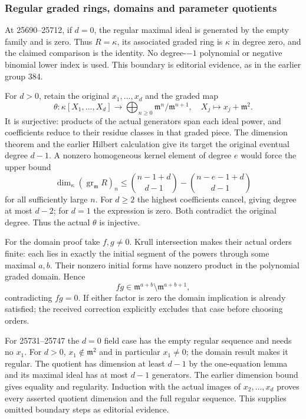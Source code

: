 \subsubsection{Regular graded rings, domains and parameter quotients}\label{algebra-proof-020-regular-graded-rings-domains-and-parameter-quotients}

At 25690--25712, if \(d=0\), the regular maximal ideal is generated by the empty family and is zero. Thus \(R=\kappa\), its associated graded ring is \(\kappa\) in degree zero, and the claimed comparison is the identity. No degree-\(-1\) polynomial or negative binomial lower index is used. This boundary is editorial evidence, as in the earlier group 384.

For \(d>0\), retain the original \(x_1,\ldots,x_d\) and the graded map \[
 \theta:\kappa[X_1,\ldots,X_d]\longrightarrow
 \bigoplus_{n\ge0}\mathfrak m^n/\mathfrak m^{n+1},\quad
 X_j\longmapsto x_j+\mathfrak m^2.
\] It is surjective: products of the actual generators span each ideal power, and coefficients reduce to their residue classes in that graded piece. The dimension theorem and the earlier Hilbert calculation give its target the original eventual degree \(d-1\). A nonzero homogeneous kernel element of degree \(e\) would force the upper bound \[
 \dim_\kappa(\operatorname{gr}_{\mathfrak m}R)_n
 \le {n-1+d\choose d-1}-{n-e-1+d\choose d-1}
\] for all sufficiently large \(n\). For \(d\ge2\) the highest coefficients cancel, giving degree at most \(d-2\); for \(d=1\) the expression is zero. Both contradict the original degree. Thus the actual \(\theta\) is injective.

For the domain proof take \(f,g\ne0\). Krull intersection makes their actual orders finite: each lies in exactly the initial segment of the powers through some maximal \(a,b\). Their nonzero initial forms have nonzero product in the polynomial graded domain. Hence \[
 fg\in\mathfrak m^{a+b}\setminus\mathfrak m^{a+b+1},
\] contradicting \(fg=0\). If either factor is zero the domain implication is already satisfied; the received correction explicitly excludes that case before choosing orders.

For 25731--25747 the \(d=0\) field case has the empty regular sequence and needs no \(x_1\). For \(d>0\), \(x_1\notin\mathfrak m^2\) and in particular \(x_1\ne0\); the domain result makes it regular. The quotient has dimension at least \(d-1\) by the one-equation lemma and its maximal ideal has at most \(d-1\) generators. The earlier dimension bound gives equality and regularity. Induction with the actual images of \(x_2,\ldots,x_d\) proves every asserted quotient dimension and the full regular sequence. This supplies omitted boundary steps as editorial evidence.


